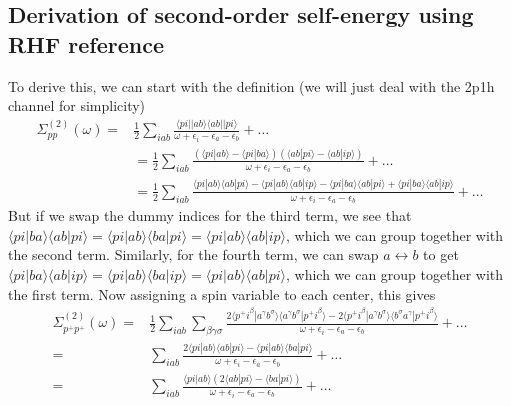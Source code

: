 \subsection{Derivation of second-order self-energy using RHF reference}
To derive this, we can start with the definition (we will just deal with the 2p1h channel for simplicity)
\begin{align}
    \Sigma_{pp}^{(2)}(\omega) =& \frac{1}{2}\sum_{iab} \frac{\langle pi || ab \rangle \langle ab || pi \rangle}{\omega + \epsilon_i - \epsilon_a - \epsilon_b} + \ldots \\
&= \frac{1}{2}\sum_{iab} \frac{\left( \langle pi | ab \rangle - \langle pi | ba \rangle \right)\left( \langle ab | pi \rangle - \langle ab | ip \rangle \right)}{\omega + \epsilon_i - \epsilon_a - \epsilon_b} + \ldots \\
&= \frac{1}{2}\sum_{iab} \frac{\langle pi | ab \rangle \langle ab | pi \rangle - \langle pi | ab \rangle \langle ab | ip \rangle - \langle pi | ba \rangle \langle ab | pi \rangle + \langle pi | ba \rangle \langle ab | ip \rangle}{\omega + \epsilon_i - \epsilon_a - \epsilon_b} + \ldots 
\end{align}
But if we swap the dummy indices for the third term, we see that $\langle pi | ba \rangle \langle ab | pi \rangle = \langle pi | ab \rangle \langle ba | pi \rangle=\langle pi | ab \rangle \langle ab | ip \rangle$, which we can group together with the second term. Similarly, for the fourth term, we can swap $a \leftrightarrow b$ to get $\langle pi | ba \rangle \langle ab | ip \rangle = \langle pi | ab \rangle \langle ba | ip \rangle = \langle pi | ab \rangle \langle ab | pi \rangle$, which we can group together with the first term. Now assigning a spin variable to each center, this gives
\begin{align}
    \Sigma_{p^{+ }p^{+ }}^{(2)}(\omega) =& \frac{1}{2}\sum_{iab} \sum_{\beta\gamma \sigma }\frac{2 \langle p^{+} i^{\beta} | a^{\gamma } b^{\sigma } \rangle \langle a^{\gamma} b^{\sigma} | p^{+} i^{\beta} \rangle - 2 \langle p^{+} i^{\beta} | a^{\gamma} b^{\sigma} \rangle \langle b^{\sigma } a^{\gamma} | p^{+} i^{\beta} \rangle}{\omega + \epsilon_i - \epsilon_a - \epsilon_b} + \ldots \\
    =& \sum_{iab} \frac{2 \langle p i | a b \rangle \langle a b | p i \rangle - \langle p i | a b \rangle \langle b a | p i \rangle}{\omega + \epsilon_i - \epsilon_a - \epsilon_b} + \ldots \\
    =& \sum_{iab} \frac{\langle p i | a b \rangle \left( 2 \langle a b | p i \rangle - \langle b a | p i \rangle \right)}{\omega + \epsilon_i - \epsilon_a - \epsilon_b} + \ldots
\end{align}
